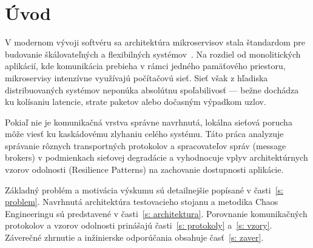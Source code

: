 \section{Úvod}

V modernom vývoji softvéru sa architektúra mikroservisov stala štandardom pre budovanie škálovateľných a flexibilných systémov~\cite{Newman2021}. Na rozdiel od monolitických aplikácií, kde komunikácia prebieha v rámci jedného pamäťového priestoru, mikroservisy intenzívne využívajú počítačovú sieť. Sieť však z hľadiska distribuovaných systémov neponúka absolútnu spoľabilivosť — bežne dochádza ku kolísaniu latencie, strate paketov alebo dočasným výpadkom uzlov.

Pokiaľ nie je komunikačná vrstva správne navrhnutá, lokálna sieťová porucha môže viesť ku kaskádovému zlyhaniu celého systému. Táto práca analyzuje správanie rôznych transportných protokolov a spracovateľov správ (message brokers) v podmienkach sieťovej degradácie a vyhodnocuje vplyv architektúrnych vzorov odolnosti (Resilience Patterns) na zachovanie dostupnosti aplikácie.

Základný problém a motivácia výskumu sú detailnejšie popísané v časti~\ref{s: problem}.
Navrhnutá architektúra testovacieho stojanu a metodika Chaos Engineeringu sú predstavené v časti~\ref{s: architektura}.
Porovnanie komunikačných protokolov a vzorov odolnosti prinášajú časti~\ref{s: protokoly} a~\ref{s: vzory}.
Záverečné zhrnutie a inžinierske odporúčania obsahuje časť~\ref{s: zaver}.